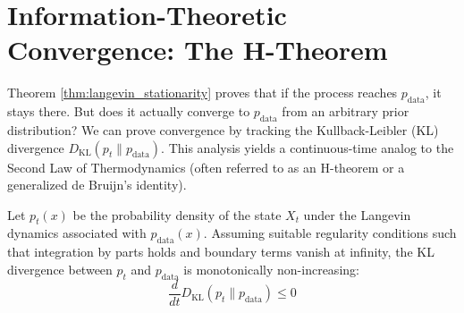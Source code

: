\section{Information-Theoretic Convergence: The H-Theorem}

Theorem \ref{thm:langevin_stationarity} proves that if the process reaches $p_{\text{data}}$, it stays there. But does it actually converge to $p_{\text{data}}$ from an arbitrary prior distribution? We can prove convergence by tracking the Kullback-Leibler (KL) divergence $D_{\text{KL}}(p_t \parallel p_{\text{data}})$. This analysis yields a continuous-time analog to the Second Law of Thermodynamics (often referred to as an H-theorem or a generalized de Bruijn's identity).

\begin{theorem}
\label{thm:kl_dissipation}
Let $p_t(x)$ be the probability density of the state $X_t$ under the Langevin dynamics associated with $p_{\text{data}}(x)$. Assuming suitable regularity conditions such that integration by parts holds and boundary terms vanish at infinity, the KL divergence between $p_t$ and $p_{\text{data}}$ is monotonically non-increasing:
\begin{equation}
    \frac{d}{dt} D_{\text{KL}}(p_t \parallel p_{\text{data}}) \le 0
\end{equation}
\end{theorem}

